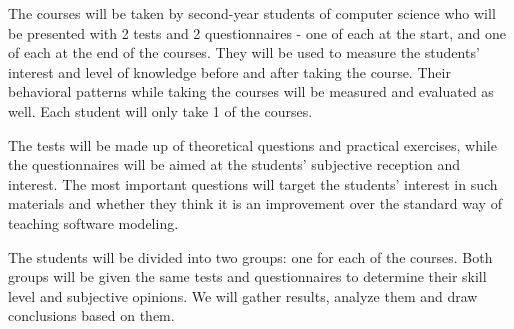 The courses will be taken by second-year students of computer science who will be presented with 2 tests and 2 questionnaires - one of each at the start, and one of each at the end of the courses. They will be used to measure the students' interest and level of knowledge before and after taking the course. Their behavioral patterns while taking the courses will be measured and evaluated as well. Each student will only take 1 of the courses.

The tests will be made up of theoretical questions and practical exercises, while the questionnaires will be aimed at the students' subjective reception and interest. The most important questions will target the students' interest in such materials and whether they think it is an improvement over the standard way of teaching software modeling.

The students will be divided into two groups: one for each of the courses. Both groups will be given the same tests and questionnaires to determine their skill level and subjective opinions. We will gather results, analyze them and draw conclusions based on them. 


